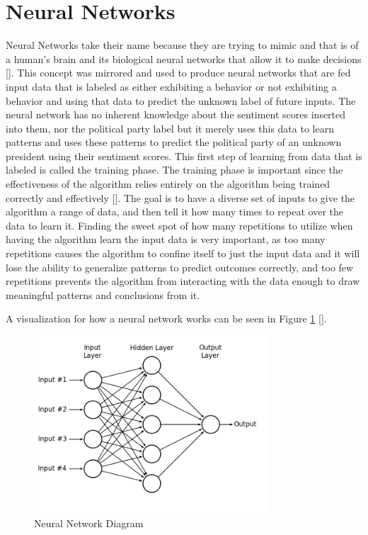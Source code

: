 \section{Neural Networks}
Neural Networks take their name because they are trying to mimic and that is of a human's brain and its biological neural networks that allow it to make decisions [\cite{hansen1990neural}].
This concept was mirrored and used to produce neural networks that are fed input data that is labeled as either exhibiting a behavior or not exhibiting a behavior and using that data to predict the unknown label of future inputs.
The neural network has no inherent knowledge about the sentiment scores inserted into them, nor the political party label but it merely uses this data to learn patterns and uses these patterns to predict the political party of an unknown president using their sentiment scores.
This first step of learning from data that is labeled is called the training phase.
The training phase is important since the effectiveness of the algorithm relies entirely on the algorithm being trained correctly and effectively [\cite{hepner1990artificial}].
The goal is to have a diverse set of inputs to give the algorithm a range of data, and then tell it how many times to repeat over the data to learn it.
Finding the sweet spot of how many repetitions to utilize when having the algorithm learn the input data is very important, as too many repetitions causes the algorithm to confine itself to just the input data and it will lose the ability to generalize patterns to predict outcomes correctly, and too few repetitions prevents the algorithm from interacting with the data enough to draw meaningful patterns and conclusions from it.

A visualization for how a neural network works can be seen in Figure \ref{fig:nndiagram} [\cite{juan2013nndiagram}].


\begin{figure}
\begin{center}
  \includegraphics[width=250pt]{images/nndiagram.png}
  \caption{Neural Network Diagram}
  \label{fig:nndiagram}
  \end{center}
\end{figure}



